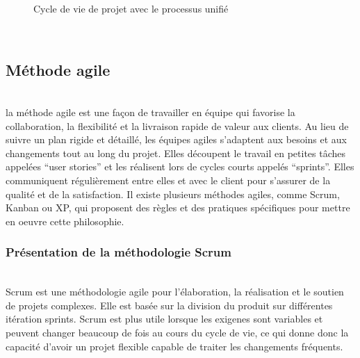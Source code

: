 \begin{figure}[H]
    \begin{center}
    \end{center}
    \caption{Cycle de vie de projet avec le processus unifié }
\end{figure}
\texttt{}\\[0.2cm]
\subsection{\Large Méthode agile }
\texttt{}\\[0.1cm]
\textsf{\selectfont{} la méthode agile est une façon de travailler en équipe qui favorise la collaboration, la flexibilité et la livraison rapide de valeur aux clients. Au lieu de suivre un plan rigide et détaillé, les équipes agiles s’adaptent aux besoins et aux changements tout au long du projet. Elles découpent le travail en petites tâches appelées “user stories” et les réalisent lors de cycles courts appelés “sprints”. Elles communiquent régulièrement entre elles et avec le client pour s’assurer de la qualité et de la satisfaction. Il existe plusieurs méthodes agiles, comme Scrum, Kanban ou XP, qui proposent des règles et des pratiques spécifiques pour mettre en oeuvre cette philosophie.
}\\[0.2cm]

\subsubsection{\Large    Présentation de la méthodologie Scrum}
\texttt{}\\[0.1cm]
\textsf{\selectfont{}
Scrum est une méthodologie agile pour l'élaboration, la réalisation et le soutien de projets complexes. Elle est basée sur la division du produit sur différentes itération sprints.
Scrum est plus utile lorsque les exigenes sont variables et peuvent changer beaucoup de fois au cours du cycle de vie, ce qui donne donc la capacité d'avoir un projet flexible capable de traiter les changements fréquents.}\\[0.2cm]
